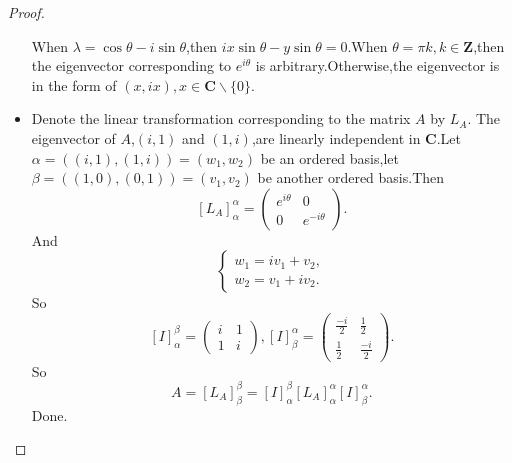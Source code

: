 ﻿\documentclass[a4paper]{article}
\begin{document}
\begin{proof}
\begin{itemize}
When $\lambda=\cos\theta-i\sin\theta$,then $ix\sin\theta -y\sin\theta
=0$.When $\theta=\pi k,k\in \mathbf{Z}$,then the eigenvector
corresponding to  $e^{i\theta}$ is arbitrary.Otherwise,the eigenvector
is in the form of $(x,ix),x\in \mathbf{C}\backslash\{0\}$.
\item 
Denote the linear transformation corresponding to the matrix
$A$ by $L_A$. The eigenvector of $A$,$(i,1)$ and $(1,i)$,are linearly independent in
$\mathbf{C}$.Let $\alpha=((i,1),(1,i))=(w_1,w_2)$ be an ordered basis,let
$\beta=((1,0),(0,1))=(v_1,v_2)$ be another ordered basis.Then 
$$ 
[L_{A}]_{\alpha}^{\alpha}=
\begin{pmatrix}
  e^{i\theta}&0\\
0&e^{-i\theta}
\end{pmatrix}.
$$
And
$$
\begin{cases}
  w_1=iv_1+v_2,\\
w_2=v_1+iv_2.
\end{cases}
$$
So
$$
[I]_{\alpha}^{\beta}=
\begin{pmatrix}
  i&1\\
1&i
\end{pmatrix},
[I]_{\beta}^{\alpha}=
\begin{pmatrix}
  \frac{-i}{2}&\frac{1}{2}\\
\frac{1}{2}&\frac{-i}{2}
\end{pmatrix}.
$$
So
$$
A=[L_A]_{\beta}^{\beta}=[I]_{\alpha}^{\beta}[L_A]_{\alpha}^{\alpha}[I]_{\beta}^{\alpha}.
$$
Done.
  \end{itemize}
\end{proof}
\end{document}
